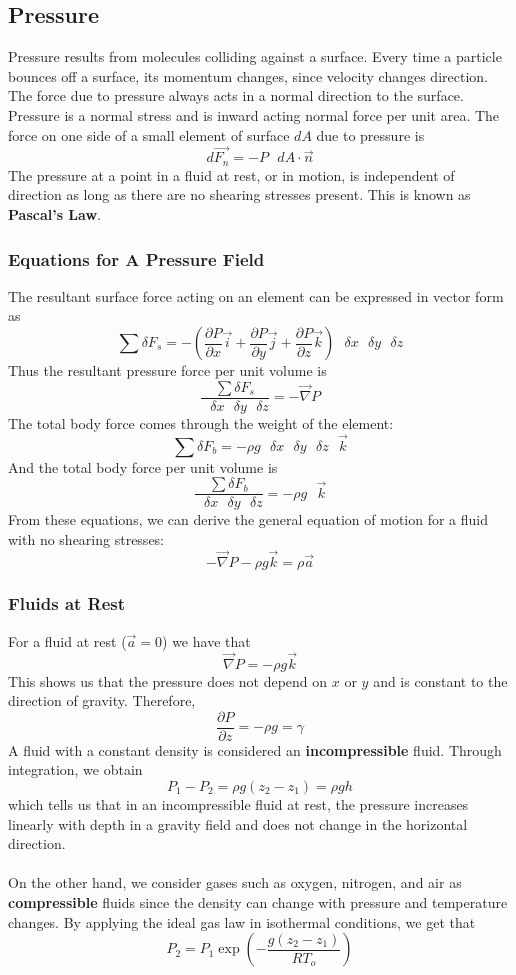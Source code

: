 \documentclass[11pt]{article}
\begin{document}
\subsection{Pressure}
Pressure results from molecules colliding against a surface. Every time a particle bounces off a surface, its momentum changes, since velocity changes direction. The force due to pressure always acts in a normal direction to the surface. Pressure is a normal stress and is inward acting normal force per unit area. The force on one side of a small element of surface $dA$ due to pressure is 
$$ d\vec{F_n} = -P\text{ } dA \cdot \vec{n} $$
The pressure at a point in a fluid at rest, or in motion, is independent of direction as long as there are no shearing stresses present. This is known as \textbf{Pascal's Law}.
\subsubsection{Equations for A Pressure Field}
The resultant surface force acting on an element can be expressed in vector form as 
$$ \sum \delta F_s = - \left(\frac{\partial P}{\partial x} \vec{i} + \frac{\partial P}{\partial y} \vec{j} + \frac{\partial P}{\partial z} \vec{k}\right) \text{ }\delta x \text{ }\delta y \text{ }\delta z $$
Thus the resultant pressure force per unit volume is 
$$\frac{\sum \delta F_s}{\text{ }\delta x \text{ }\delta y \text{ }\delta z} = - \vec{\nabla} P$$
The total body force comes through the weight of the element:
$$ \sum \delta F_b = - \rho g \text{ }\delta x \text{ }\delta y \text{ }\delta z \text{ } \vec{k} $$
And the total body force per unit volume is
$$\frac{\sum \delta F_b}{\text{ }\delta x \text{ }\delta y \text{ }\delta z} = - \rho g \text{ } \vec{k} $$
From these equations, we can derive the general equation of motion for a fluid with no shearing stresses:
$$ - \vec{\nabla} P - \rho g \vec{k} = \rho \vec{a} $$
\subsubsection{Fluids at Rest}
For a fluid at rest ($\vec{a}=0$) we have that 
$$ \vec{\nabla} P = - \rho g \vec{k}$$
This shows us that the pressure does not depend on $x$ or $y$ and is constant to the direction of gravity. Therefore,
$$ \frac{\partial P}{\partial z} = -\rho g = \gamma $$
A fluid with a constant density is considered an \textbf{incompressible} fluid. Through integration, we obtain
$$ P_1 - P_2 = \rho g (z_2 - z_1) = \rho g h$$
which tells us that in an incompressible fluid at rest, the pressure increases linearly with depth in a gravity field and does not change in the horizontal direction.
\\ \\
On the other hand, we consider gases such as oxygen, nitrogen, and air as \textbf{compressible} fluids since the density can change with pressure and temperature changes. By applying the ideal gas law in isothermal conditions, we get that
$$ P_2 = P_1 \exp{\left(-\frac{g(z_2 - z_1)}{RT_o}\right)}$$
\end{document}
